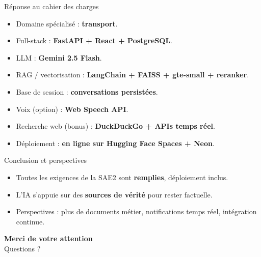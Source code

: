 \documentclass[aspectratio=169,11pt]{beamer}
\newcommand{\hl}[1]{\textbf{\color{accent}#1}}
\begin{document}
\begin{frame}{Réponse au cahier des charges}
  \begin{itemize}\small
    \item Domaine spécialisé : \hl{transport}.
    \item Full-stack : \hl{FastAPI + React + PostgreSQL}.
    \item LLM : \hl{Gemini 2.5 Flash}.
    \item RAG / vectorisation : \hl{LangChain + FAISS + gte-small + reranker}.
    \item Base de session : \hl{conversations persistées}.
    \item Voix (option) : \hl{Web Speech API}.
    \item Recherche web (bonus) : \hl{DuckDuckGo + APIs temps réel}.
    \item Déploiement : \hl{en ligne sur Hugging Face Spaces + Neon}.
  \end{itemize}
\end{frame}

\begin{frame}{Conclusion et perspectives}
  \begin{itemize}
    \item Toutes les exigences de la SAE2 sont \hl{remplies}, déploiement inclus.
    \item L'IA s'appuie sur des \hl{sources de vérité} pour rester factuelle.
    \item Perspectives : plus de documents métier, notifications temps réel,
          intégration continue.
  \end{itemize}
  \vfill
  \begin{center}
    {\Large\color{dark}\bfseries Merci de votre attention}\\[0.3cm]
    {\small\color{soft} Questions ?}
  \end{center}
\end{frame}
\end{document}
